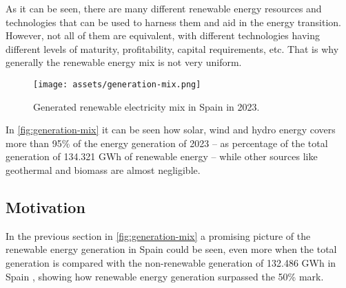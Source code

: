 As it can be seen, there are many different renewable energy resources and technologies that can be used to harness them and aid in the energy transition. However, not all of them are equivalent, with different technologies having different levels of maturity, profitability, capital requirements, etc. That is why generally the renewable energy mix is not very uniform. 

\begin{figure}[ht]
    \centering
    \captionsetup{justification=centering}
    \texttt{[image: assets/generation-mix.png]}
    \caption{Generated renewable electricity mix in Spain in 2023. \cite{renewable_generation_reports_2023}}
    \label{fig:generation-mix}
\end{figure}

In \autoref{fig:generation-mix} it can be seen how solar, wind and hydro energy covers more than 95\% of the energy generation of 2023 -- as percentage of the total generation of 134.321 GWh of renewable energy -- while other sources like geothermal and biomass are almost negligible. 

\subsection{Motivation}
\label{sec:motivation}

In the previous section in \autoref{fig:generation-mix} a promising picture of the renewable energy generation in Spain could be seen, even more when the total generation is compared with the non-renewable generation of 132.486 GWh in Spain \cite{renewable_generation_reports_2023}, showing how renewable energy generation surpassed the 50\% mark.

